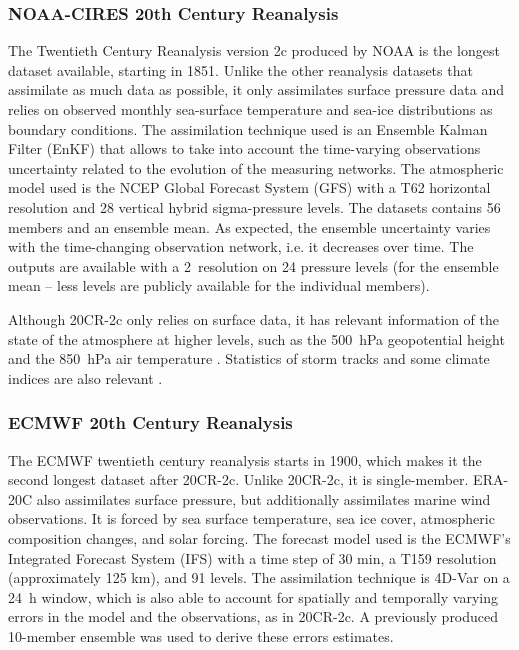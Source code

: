 \documentclass{ametsoc}
\begin{document}
\subsubsection{NOAA-CIRES 20th Century Reanalysis}

The Twentieth Century Reanalysis version 2c \citep[20CR-2c, ][]{Compo2011} produced by NOAA is the longest dataset available, starting in 1851. Unlike the other reanalysis datasets that assimilate as much data as possible, it only assimilates surface pressure data and relies on observed monthly sea-surface temperature and sea-ice distributions as boundary conditions. The assimilation technique used is an Ensemble Kalman Filter (EnKF) that allows to take into account the time-varying observations uncertainty related to the evolution of the measuring networks. The atmospheric model used is the NCEP Global Forecast System (GFS) with a T62 horizontal resolution and 28 vertical hybrid sigma-pressure levels. The datasets contains 56 members and an ensemble mean. As expected, the ensemble uncertainty varies with the time-changing observation network, i.e. it decreases over time. The outputs are available with a 2\degree\ resolution on 24 pressure levels (for the ensemble mean -- less levels are publicly available for the individual members).

Although 20CR-2c only relies on surface data, it has relevant information of the state of the atmosphere at higher levels, such as the 500~hPa geopotential height and the 850~hPa air temperature \citep{Compo2011}. Statistics of storm tracks and some climate indices are also relevant \citep{Compo2011}.


\subsubsection{ECMWF 20th Century Reanalysis}

The ECMWF twentieth century reanalysis \citep[ERA-20C, ][]{Poli2016} starts in 1900, which makes it the second longest dataset after 20CR-2c. Unlike 20CR-2c, it is single-member. ERA-20C also assimilates surface pressure, but additionally assimilates marine wind observations. It is forced by sea surface temperature, sea ice cover, atmospheric composition changes, and solar forcing. The forecast model used is the ECMWF’s Integrated Forecast System (IFS) with a time step of 30 min, a T159 resolution (approximately 125 km), and 91 levels. The assimilation technique is 4D-Var on a 24~h window, which is also able to account for spatially and temporally varying errors in the model and the observations, as in 20CR-2c. A previously produced 10-member ensemble was used to derive these errors estimates.
\end{document}
